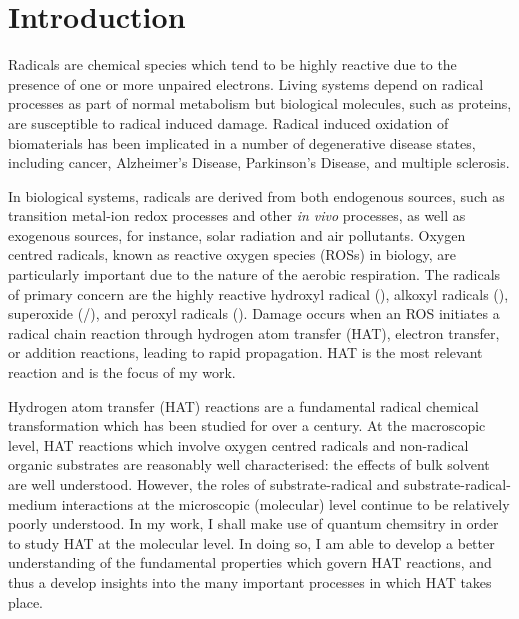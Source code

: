 
 \chapter{Introduction}

Radicals are chemical species which tend to be highly reactive due to the
presence of one or more unpaired electrons. Living systems depend on radical
processes as part of normal metabolism but biological molecules, such as
proteins, are susceptible to radical induced damage. Radical induced oxidation
of biomaterials has been implicated in a number of degenerative disease states,
including cancer, Alzheimer's Disease, Parkinson's Disease, and multiple
sclerosis.\cite{Barnham2004,Halliwell2007,Valko2007,Hwang2013,Halliwell2015}

In biological systems, radicals are derived from both endogenous sources, such
as transition metal-ion redox processes and other \emph{in vivo} processes, as
well as exogenous sources, for instance, solar radiation and air pollutants.
Oxygen centred radicals, known as reactive oxygen species (ROSs) in biology, are
particularly important due to the nature of the aerobic respiration. The
radicals of primary concern are the highly reactive hydroxyl radical
(), alkoxyl radicals (), superoxide (/),
and peroxyl radicals ().\cite{Halliwell2015} Damage occurs when an ROS
initiates a radical chain reaction through hydrogen atom transfer (HAT),
electron transfer, or addition reactions, leading to rapid propagation. HAT is
the most relevant reaction and is the focus of my work.

Hydrogen atom transfer (HAT) reactions are a fundamental radical chemical
transformation which has been studied for over a
century.\cite{Kochi1973,Parsons2000} At the macroscopic level, HAT reactions
which involve oxygen centred radicals and non-radical organic substrates are
reasonably well characterised: the effects of bulk solvent are well
understood.\cite{Litwinienko2007} However, the roles of substrate-radical and
substrate-radical-medium interactions at the microscopic (molecular) level
continue to be relatively poorly understood. In my work, I shall make use of
quantum chemsitry in order to study HAT at the molecular level. In doing so, I
am able to develop a better understanding of the fundamental properties which
govern HAT reactions, and thus a develop insights into the many important
processes in which HAT takes place.

